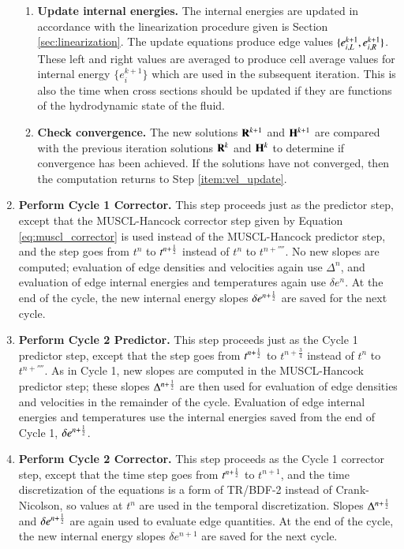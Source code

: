 \begin{enumerate}
\begin{enumerate}
\item \textbf{Update internal energies.} The internal energies are
updated in accordance with the linearization procedure given is Section
\ref{sec:linearization}. The update equations produce edge values
$\{e^{k+1}_{i,L},e^{k+1}_{i,R}\}$. These left and right values are
averaged to produce cell average values for internal energy $\{e^{k+1}_i\}$
which are used in the subsequent iteration.
This is also the time when cross sections should be updated
if they are functions of the hydrodynamic state of the fluid.

\item \textbf{Check convergence.} The new solutions $\mathbf{R}^{k+1}$ and
$\mathbf{H}^{k+1}$ are compared with the previous iteration solutions
$\mathbf{R}^k$ and $\mathbf{H}^k$ to determine if convergence has been achieved.
If the solutions have not converged, then the computation
returns to Step \ref{item:vel_update}.
\end{enumerate}


\item \textbf{Perform Cycle 1 Corrector.} This step proceeds
just as the predictor step, except that the MUSCL-Hancock
corrector step given by Equation \eqref{eq:muscl_corrector} is used instead of the MUSCL-Hancock predictor
step, and the step goes from $t^n$ to $t^{n+\frac{1}{2}}$ instead
of $t^n$ to $t^{n+\fourth}$. No new slopes are computed;
evaluation of edge densities and velocities again use
$\Delta^n$, and evaluation of edge internal energies
and temperatures again use $\delta e^n$. At the end
of the cycle, the new internal energy slopes $\delta e^{n+\frac{1}{2}}$
are saved for the next cycle.


\item \textbf{Perform Cycle 2 Predictor.} This step proceeds
just as the Cycle 1 predictor step, except that the
step goes from $t^{n+\frac{1}{2}}$ to $t^{n+\frac{3}{4}}$ instead
of $t^n$ to $t^{n+\fourth}$. As in Cycle 1, new slopes
are computed in the MUSCL-Hancock predictor step;
these slopes $\Delta^{n+\frac{1}{2}}$ are then used for
evaluation of edge densities and velocities in the remainder
of the cycle. Evaluation of edge internal energies
and temperatures use the internal energies saved
from the end of Cycle 1, $\delta e^{n+\frac{1}{2}}$.


\item \textbf{Perform Cycle 2 Corrector.} This step proceeds
as the Cycle 1 corrector step, except that the time step goes
from $t^{n+\frac{1}{2}}$ to $t^{n+1}$, and the time discretization
of the equations is a form of TR/BDF-2
instead of Crank-Nicolson, so values at $t^n$
are used in the temporal discretization. Slopes
$\Delta^{n+\frac{1}{2}}$ and $\delta e^{n+\frac{1}{2}}$ are again
used to evaluate edge quantities. At the end
of the cycle, the new internal energy slopes $\delta e^{n+1}$
are saved for the next cycle.


\end{enumerate}
